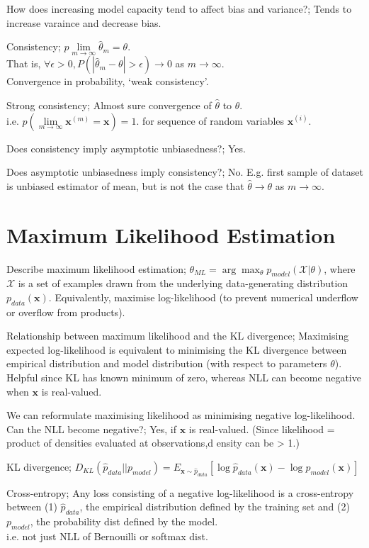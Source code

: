 \documentclass{article}
\begin{document}
How does increasing model capacity tend to affect bias and variance?; Tends to increase varaince and decrease bias.

Consistency; $p\lim\limits_{m\rightarrow\infty}\hat{\theta}_m = \theta$. \\ That is, $\forall \epsilon > 0, P(|\hat{\theta}_m-\theta|>\epsilon)\rightarrow 0$ as $m\rightarrow\infty$. \\ Convergence in probability, `weak consistency'.

Strong consistency; Almost sure convergence of $\hat{\theta}$ to $\theta$. \\ i.e. $p(\lim\limits_{m\rightarrow\infty}\mathbf{x}^{(m)}=\mathbf{x})=1$. for sequence of random variables $\mathbf{x}^{(i)}$.

Does consistency imply asymptotic unbiasedness?; Yes.

Does asymptotic unbiasedness imply consistency?; No. E.g. first sample of dataset is unbiased estimator of mean, but is not the case that $\hat{\theta}\rightarrow\theta$ as $m\rightarrow\infty$.

\section{Maximum Likelihood Estimation}

Describe maximum likelihood estimation; $\theta_{ML} = \arg\max_{\theta} p_{model}(\mathcal{X} | \theta)$, where $\mathcal{X}$ is a set of examples drawn from the underlying data-generating distribution $p_{data}(\mathbf{x})$. Equivalently, maximise log-likelihood (to prevent numerical underflow or overflow from products).

Relationship between maximum likelihood and the KL divergence; Maximising expected log-likelihood is equivalent to minimising the KL divergence between empirical distribution and model distribution (with respect to parameters $\theta$). Helpful since KL has known minimum of zero, whereas NLL can become negative when $\mathbf{x}$ is real-valued.

We can reformulate maximising likelihood as minimising negative log-likelihood. Can the NLL become negative?; Yes, if $\mathbf{x}$ is real-valued. (Since likelihood = product of densities evaluated at observations,d ensity can be > 1.)

KL divergence; $D_{KL}(\hat{p}_{data}||p_{model}) = E_{\mathbf{x}\sim \hat{p}_{data}}[\log\hat{p}_{data}(\mathbf{x})-\log p_{model}(\mathbf{x})]$

Cross-entropy; Any loss consisting of a negative log-likelihood is a cross-entropy between (1) $\hat{p}_{data}$, the empirical distribution defined by the training set and (2) $p_{model}$, the probability dist defined by the model. \\ i.e. not just NLL of Bernouilli or softmax dist.
\end{document}
